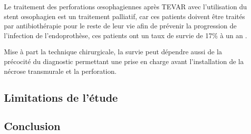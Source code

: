 \documentclass[./tfe.tex]{subfiles}
\begin{document}
Le traitement des perforations œsophagiennes après TEVAR avec l'utilisation du stent œsophagien est un traitement palliatif, car ces patients doivent être traités par antibiothérapie pour le reste de leur vie afin de prévenir la progression de l'infection de l'endoprothèse, ces patients ont un taux de survie de 17\% à un an \cite{czerny_new_2014}.

Mise à part la technique chirurgicale, la survie peut dépendre aussi de la précocité du diagnostic permettant une prise en charge avant l’installation de la nécrose transmurale et la perforation.

\subsection*{Limitations de l’étude}


\subsection*{Conclusion}

\end{document}
